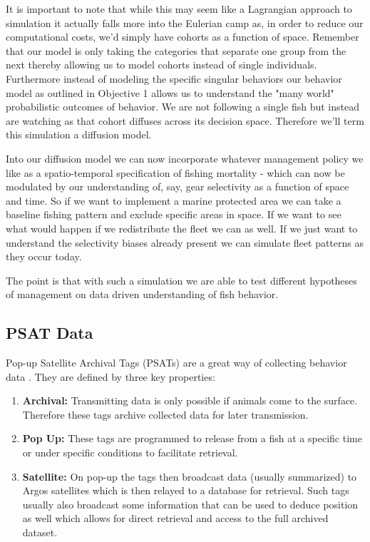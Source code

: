 \documentclass[11pt]{article}
\begin{document}
It is important to note that while this may seem like a Lagrangian approach to simulation it actually falls more into the Eulerian camp as, in order to reduce our computational costs, we'd simply have cohorts as a function of space. Remember that our model is only taking the categories that separate one group from the next thereby allowing us to model cohorts instead of single individuals. Furthermore instead of modeling the specific singular behaviors our behavior model as outlined in Objective 1 allows us to understand the "many world" probabilistic outcomes of behavior. We are not following a single fish but instead are watching as that cohort diffuses across its decision space. Therefore we'll term this simulation a diffusion model.

Into our diffusion model we can now incorporate whatever management policy we like as a spatio-temporal specification of fishing mortality - which can now be modulated by our understanding of, say, gear selectivity as a function of space and time. So if we want to implement a marine protected area we can take a baseline fishing pattern and exclude specific areas in space. If we want to see what would happen if we redistribute the fleet we can as well. If we just want to understand the selectivity biases already present we can simulate fleet patterns as they occur today. 

The point is that with such a simulation we are able to test different hypotheses of management on data driven understanding of fish behavior. 


\subsection{PSAT Data}

Pop-up Satellite Archival Tags (PSATs) are a great way of collecting behavior data \citep{PSAT}. They are defined by three key properties:

\begin{enumerate}
\item \textbf{Archival:} Transmitting data is only possible if animals come to the surface. Therefore these tags archive collected data for later transmission. 
\item \textbf{Pop Up:} These tags are programmed to release from a fish at a specific time or under specific conditions to facilitate retrieval. 
\item \textbf{Satellite:} On pop-up the tags then broadcast data (usually summarized) to Argos satellites which is then relayed to a database for retrieval. Such tags usually also broadcast some information that can be used to deduce position as well which allows for direct retrieval and access to the full archived dataset.
\end{enumerate}
\end{document}
